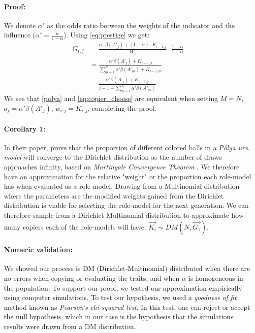 \documentclass[11pt]{article}
\begin{document}
\paragraph{Proof:} 
We denote $\alpha'$ as the odds ratio between the weights of the indicator and the influence ($\alpha'=\frac{\alpha}{1-\alpha}$). 
Using \cref{eq:prestige} we get:
\begin{equation}\label{eq:copier_choose}
\begin{split}
G_{i,j} & = \frac{\alpha\cdot \beta(A'_j) + (1-\alpha) \cdot K_{i-1,j}}{W_i} \cdot \frac{1-\alpha}{1-\alpha} \\
&= \frac{\alpha'\beta(A'_j) + K_{i-1,j}}{\sum\limits_{m=1}^{N} \alpha'\beta(A'_m) + K_{i-1,m}}\\
& =\frac{\alpha'\beta(A'_j) + K_{i-1,j}}{i-1 + \sum\limits_{m=1}^{N} \alpha'\beta(A'_m)}
\end{split}
\end{equation}
We see that \cref{polya} and \cref{eq:copier_choose} are equivalent when setting $M=N$, $o_j = \alpha'\beta(A'_j)$, $w_{i,j} = K_{i,j}$, completing the proof.

\paragraph{Corollary 1:}
In their paper, \citet[section 2]{dirichlet} prove that the proportion of different colored balls in a \textit{Pólya urn model} will converge to the Dirichlet distribution as the number of draws approaches infinity, based on \textit{Martingale Convergence Theorem} \citep{martingaleBook}.
We therefore have an approximation for the relative "weight" or the proportion each role-model has when evaluated as a role-model. Drawing from a Multinomial distribution where the parameters are the modified weights gained from the Dirichlet distribution is viable for selecting the role-model for the next generation.
We can therefore sample from a Dirichlet-Multinomial distribution to approximate how many copiers each of the role-models will have:
$\vec{K_i} \sim DM(N,\vec{G_1})$.

\paragraph{Numeric validation:} We showed our process is DM (Dirichlet-Multinomial) distributed when there are no errors when copying or evaluating the traits, and when $\alpha$ is homogeneous in the population. To support our proof, we tested our approximation empirically using computer simulations.
To test our hypothesis, we used a \textit{goodness of fit} method known as \textit{Pearson's chi-squared test}. In this test, one can reject or accept the null hypothesis, which in our case is the hypothesis that the simulations results were drawn from a DM distribution.
\end{document}
